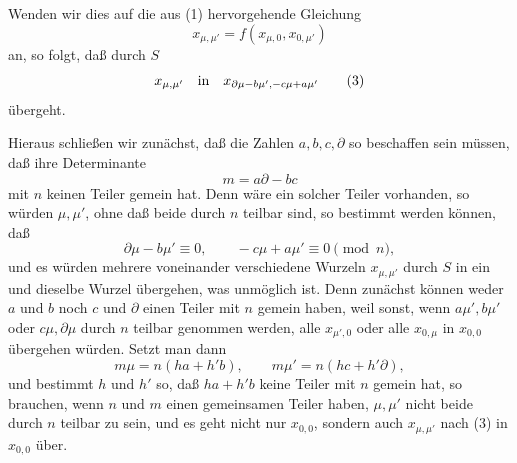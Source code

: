 \documentclass[11pt]{article}
\begin{document}
Wenden wir dies auf die aus (1) hervorgehende Gleichung
\[
 x_{\mu,\mu'}=f(x_{\mu,0},x_{0,\mu'})
\]
an, so folgt, daß durch $S$
\begin{equation}
 x_{\mu,\mu'}\quad\hbox{in}\quad x_{\partial\mu-b\mu',-c\mu+a\mu'}
\tag{3}
\end{equation}
übergeht.

Hieraus schließen wir zunächst, daß die Zahlen $a,b,c,\partial$ so beschaffen sein müssen,
daß ihre Determinante
\begin{equation}
 m=a\partial-bc
\tag{4}
\end{equation}
mit $n$ keinen Teiler gemein hat. Denn wäre ein solcher Teiler vorhanden, so würden
$\mu,\mu'$, ohne daß beide durch $n$ teilbar sind, so bestimmt werden können, daß
\[
 \partial\mu-b\mu'\equiv0,
 \qquad -c\mu+a\mu'\equiv0\pmod n,
\]
und es würden mehrere voneinander verschiedene Wurzeln $x_{\mu,\mu'}$ durch $S$ in ein
und dieselbe Wurzel übergehen, was unmöglich ist. Denn zunächst können weder $a$ und
$b$ noch $c$ und $\partial$ einen Teiler mit $n$ gemein haben, weil sonst, wenn
$a\mu',b\mu'$ oder $c\mu,\partial\mu$ durch $n$ teilbar genommen werden, alle
$x_{\mu',0}$ oder alle $x_{0,\mu}$ in $x_{0,0}$ übergehen würden. Setzt man dann
\[
 m\mu=n(ha+h'b),
 \qquad m\mu'=n(hc+h'\partial),
\]
und bestimmt $h$ und $h'$ so, daß $ha+h'b$ keine Teiler mit $n$ gemein hat, so brauchen,
wenn $n$ und $m$ einen gemeinsamen Teiler haben, $\mu,\mu'$ nicht beide durch $n$ teilbar
zu sein, und es geht nicht nur $x_{0,0}$, sondern auch $x_{\mu,\mu'}$ nach (3) in $x_{0,0}$
über.
\end{document}
